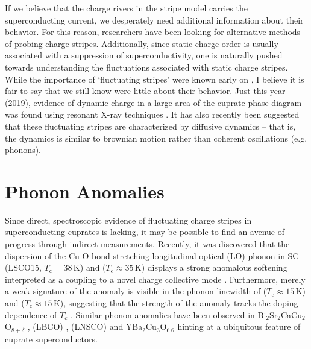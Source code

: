If we believe that the charge rivers in the stripe model carries the superconducting current, we desperately need additional information about their behavior. For this reason, researchers have been looking for alternative methods of probing charge stripes. Additionally, since static charge order is usually associated with a suppression of superconductivity, one is naturally pushed towards understanding the fluctuations associated with static charge stripes. While the importance of `fluctuating stripes' were known early on \cite{Kivelson2003}, I believe it is fair to say that we still know were little about their behavior. Just this year (2019), evidence of dynamic charge in a large area of the cuprate phase diagram was found using resonant X-ray techniques \cite{Arpaia2019}. It has also recently been suggested that these fluctuating stripes are characterized by diffusive dynamics \cite{Mitrano2019} -- that is, the dynamics is similar to brownian motion rather than coherent oscillations (e.g. phonons).

\section{Phonon Anomalies}
Since direct, spectroscopic evidence of fluctuating charge stripes in superconducting cuprates is lacking, it may be possible to find an avenue of progress through indirect measurements. Recently, it was discovered that the dispersion of the Cu-O bond-stretching longitudinal-optical (LO) phonon in SC \LSCOopt{} (LSCO15, $T_\text{c} = 38\,\text{K}$) \cite{Reznik2007} and \LSCOTwenty{} ($T_\text{c} \approx 35\,\text{K}$) \cite{Park2014} displays a strong anomalous softening interpreted as a coupling to a novel charge collective mode \cite{Park2014}. Furthermore, merely a weak signature of the anomaly is visible in the phonon linewidth of \LSCOseven{} ($T_\text{c} \approx 15\,\text{K}$)  and \LSCOTwentyfive{} ($T_\text{c} \approx 15\,\text{K}$), suggesting that the strength of the anomaly tracks the doping-dependence of $T_c$ \cite{Park2014}. Similar phonon anomalies have been observed in Bi$_2$Sr$_2$CaCu$_2$O$_{8+\delta}$ \cite{Chaix2017}, \LBCOtwelve{} (LBCO) \cite{Reznik2006}, \LNSCO{} (LNSCO) \cite{Reznik2007} and YBa$_2$Cu$_3$O$_{6.6}$ \cite{LeTacon2014} hinting at a ubiquitous feature of cuprate superconductors.

